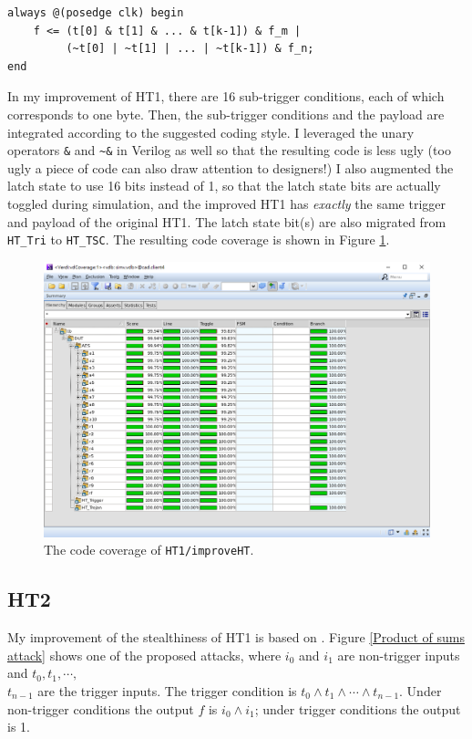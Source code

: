 \documentclass{article}
\begin{document}
\begin{verbatim}
always @(posedge clk) begin
    f <= (t[0] & t[1] & ... & t[k-1]) & f_m |
         (~t[0] | ~t[1] | ... | ~t[k-1]) & f_n;
end
\end{verbatim}

In my improvement of HT1, there are 16 sub-trigger conditions, each of which corresponds to one byte. Then, the sub-trigger conditions and the payload are integrated according to the suggested coding style. I leveraged the unary operators \verb|&| and \verb|~&| in Verilog as well so that the resulting code is less ugly (too ugly a piece of code can also draw attention to designers!) I also augmented the latch state to use 16 bits instead of 1, so that the latch state bits are actually toggled during simulation, and the improved HT1 has \textit{exactly} the same trigger and payload of the original HT1. The latch state bit(s) are also migrated from \verb|HT_Tri| to \verb|HT_TSC|. The resulting code coverage is shown in Figure \ref{improveHT1}.

\begin{figure}[htp] \centering
\includegraphics[width=\textwidth]{improveHT1}
\caption{The code coverage of \texttt{HT1/improveHT}.}
\label{improveHT1}
\end{figure}

\subsection{HT2}

My improvement of the stealthiness of HT1 is based on \cite{5958022}. Figure \ref{Product of sums attack} shows one of the proposed attacks, where $i_0$ and $i_1$ are non-trigger inputs and $t_0,t_1,\cdots,$\\$t_{n-1}$ are the trigger inputs. The trigger condition is $t_0\wedge t_1\wedge\cdots\wedge t_{n-1}$. Under non-trigger conditions the output $f$ is $i_0\wedge i_1$; under trigger conditions the output is 1.
\end{document}
